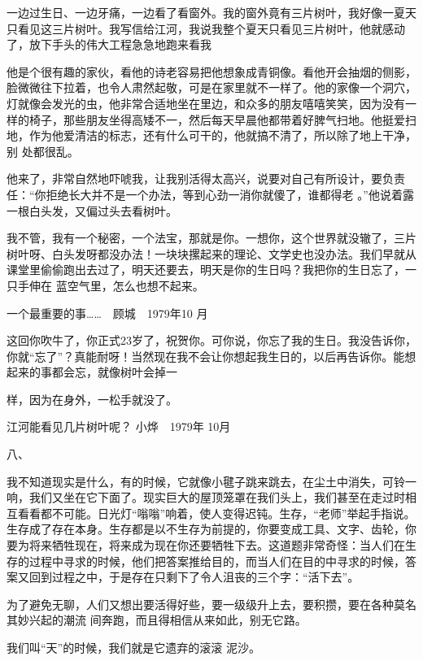 \documentclass{article}
\begin{document}
一边过生日、一边牙痛，一边看了看窗外。我的窗外竟有三片树叶，我好像一夏天只看见这三片树叶。我写信给江河，我说我整个夏天只看见三片树叶，他就感动了，放下手头的伟大工程急急地跑来看我

他是个很有趣的家伙，看他的诗老容易把他想象成青铜像。看他开会抽烟的侧影，脸微微往下拉着，也令人肃然起敬，可是在家里就不一样了。他的家像一个洞穴，灯就像会发光的虫，他非常合适地坐在里边，和众多的朋友嘻嘻笑笑，因为没有一样的椅子，那些朋友坐得高矮不一，然后每天早晨他都带着好脾气扫地。他挺爱扫地，作为他爱清洁的标志，还有什么可干的，他就搞不清了，所以除了地上干净，别
处都很乱。 

\newpage

他来了，非常自然地吓唬我，让我别活得太高兴，说要对自己有所设计，要负责任：“你拒绝长大并不是一个办法，等到心劲一消你就傻了，谁都得老
。”他说着露一根白头发，又偏过头去看树叶。 

我不管，我有一个秘密，一个法宝，那就是你。一想你，这个世界就没辙了，三片树叶呀、白头发呀都没办法！一块块摞起来的理论、文学史也没办法。我们早就从课堂里偷偷跑出去过了，明天还要去，明天是你的生日吗？我把你的生日忘了，一只手伸在
蓝空气里，怎么也想不起来。 

一个最重要的事……　顾城　1979年10
月 



这回你吹牛了，你正式23岁了，祝贺你。可你说，你忘了我的生日。我没告诉你，你就“忘了”？真能耐呀！当然现在我不会让你想起我生日的，以后再告诉你。能想起来的事都会忘，就像树叶会掉一
\newpage

样，因为在身外，一松手就没了。 

江河能看见几片树叶呢？ 小烨　1979年
10月 


八、 



我不知道现实是什么，有的时候，它就像小毽子跳来跳去，在尘土中消失，可铃一响，我们又坐在它下面了。现实巨大的屋顶笼罩在我们头上，我们甚至在走过时相互看看都不可能。日光灯“嗡嗡”响着，使人变得迟钝。生存，“老师”举起手指说。生存成了存在本身。生存都是以不生存为前提的，你要变成工具、文字、齿轮，你要为将来牺牲现在，将来成为现在你还要牺牲下去。这道题非常奇怪：当人们在生存的过程中寻求的时候，他们把答案推给目的，而当人们在目的中寻求的时候，答案又回到过程之中，于是存在只剩下了令人沮丧的三个字：“活下去”。

\newpage

为了避免无聊，人们又想出要活得好些，要一级级升上去，要积攒，要在各种莫名其妙兴起的潮流
间奔跑，而且得相信从来如此，别无它路。 

我们叫“天”的时候，我们就是它遗弃的滚滚
泥沙。 
\end{document}
